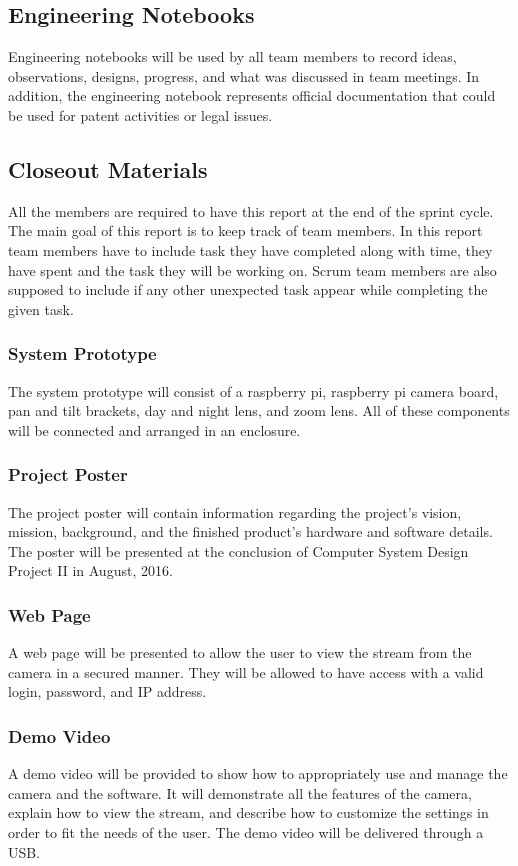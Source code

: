 \subsection{Engineering Notebooks}
Engineering notebooks will be used by all team members to record ideas, observations, designs, progress, and what was discussed in team meetings. In addition, the engineering notebook represents official documentation that could be used for patent activities or legal issues. 

\subsection{Closeout Materials}
All the members are required to have this report at the end of the sprint cycle. The main goal of this report is to keep track of team members. In this report team members have to include task they have completed along with time, they have spent and the task they will be working on. Scrum team members are also supposed to include if any other unexpected task appear while completing the given task.

\subsubsection{System Prototype}
The system prototype will consist of a raspberry pi, raspberry pi camera board, pan and tilt brackets, day and night lens, and zoom lens. All of these components will be connected and arranged in an enclosure. 

\subsubsection{Project Poster}
The project poster will contain information regarding the project’s vision, mission, background, and the finished product’s hardware and software details. The poster will be presented at the conclusion of Computer System Design Project II in August, 2016. 

\subsubsection{Web Page}
A web page will be presented to allow the user to view the stream from the camera in a secured manner. They will be allowed to have access with a valid login, password, and IP address. 

\subsubsection{Demo Video}
A demo video will be provided to show how to appropriately use and manage the camera and the software. It will demonstrate all the features of the camera, explain how to view the stream, and describe how to customize the settings in order to fit the needs of the user. The demo video will be delivered through a USB. 

